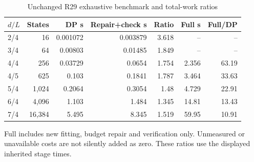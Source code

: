 \begin{table}[htbp]
\centering\footnotesize
\caption{Unchanged R29 exhaustive benchmark and total-work ratios}\label{tab:legacy30}
\begin{tabular}{lrrrrrr}\toprule
$d/L$ & States & DP s & Repair+check s & Ratio & Full s & Full/DP \\\midrule
2/4 & 16 & 0.001072 & 0.003879 & 3.618 & -- & -- \\
3/4 & 64 & 0.00803 & 0.01485 & 1.849 & -- & -- \\
4/4 & 256 & 0.03729 & 0.0654 & 1.754 & 2.356 & 63.19 \\
4/5 & 625 & 0.103 & 0.1841 & 1.787 & 3.464 & 33.63 \\
5/4 & 1,024 & 0.2064 & 0.3054 & 1.48 & 4.729 & 22.91 \\
6/4 & 4,096 & 1.103 & 1.484 & 1.345 & 14.81 & 13.43 \\
7/4 & 16,384 & 5.495 & 8.345 & 1.519 & 59.95 & 10.91 \\
\bottomrule\end{tabular}
\par\smallskip\begin{minipage}{.98\textwidth}\footnotesize Full includes new fitting, budget repair and verification only. Unmeasured or unavailable costs are not silently added as zero. These ratios use the displayed inherited stage times.\end{minipage}
\end{table}
